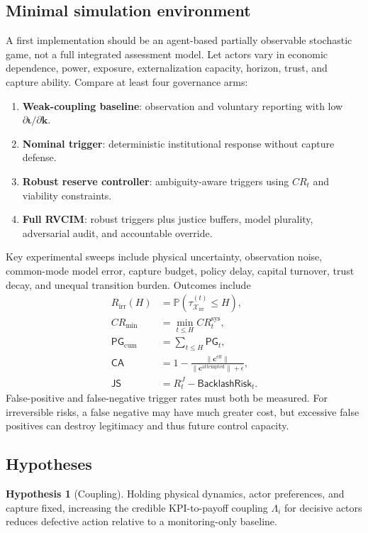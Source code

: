 \documentclass[11pt,a4paper]{article}
\numberwithin{equation}{section}
\theoremstyle{definition}
\newtheorem{hypothesis}[definition]{Hypothesis}
\theoremstyle{plain}
\theoremstyle{remark}
\newcommand{\Pp}{\mathbb{P}}
\newcommand{\irrev}{\mathcal{X}_{\mathrm{irr}}}
\newcommand{\kpi}{\bm{k}}
\newcommand{\capture}{\bm{c}}
\newcommand{\inst}{\bm{\iota}}
\begin{document}
\subsection{Minimal simulation environment}

A first implementation should be an agent-based partially observable stochastic game, not a full integrated assessment model. Let actors vary in economic dependence, power, exposure, externalization capacity, horizon, trust, and capture ability. Compare at least four governance arms:
\begin{enumerate}
  \item \textbf{Weak-coupling baseline}: observation and voluntary reporting with low $\partial\inst/\partial\kpi$.
  \item \textbf{Nominal trigger}: deterministic institutional response without capture defense.
  \item \textbf{Robust reserve controller}: ambiguity-aware triggers using $CR_t$ and viability constraints.
  \item \textbf{Full RVCIM}: robust triggers plus justice buffers, model plurality, adversarial audit, and accountable override.
\end{enumerate}

Key experimental sweeps include physical uncertainty, observation noise, common-mode model error, capture budget, policy delay, capital turnover, trust decay, and unequal transition burden. Outcomes include
\begin{align}
R_{\mathrm{irr}}(H)&=\Pp(\tau_{\irrev}^{(t)}\le H), \\
CR_{\min}&=\min_{t\le H}CR_t^{\mathrm{sys}}, \\
\mathsf{PG}_{\mathrm{cum}}&=\sum_{t\le H}\mathsf{PG}_t, \\
\mathsf{CA}&=1-\frac{\|\capture^{\mathrm{eff}}\|}{\|\capture^{\mathrm{attempted}}\|+\epsilon}, \\
\mathsf{JS}&=R_t^J-\mathsf{BacklashRisk}_t.
\end{align}
False-positive and false-negative trigger rates must both be measured. For irreversible risks, a false negative may have much greater cost, but excessive false positives can destroy legitimacy and thus future control capacity.

\subsection{Hypotheses}

\begin{hypothesis}[Coupling]
Holding physical dynamics, actor preferences, and capture fixed, increasing the credible KPI-to-payoff coupling $\Lambda_i$ for decisive actors reduces defective action relative to a monitoring-only baseline.
\end{hypothesis}
\end{document}
